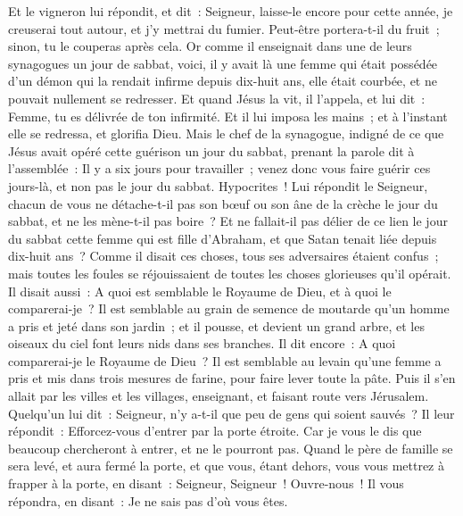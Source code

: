 \begin{multicols}{2}
Et le vigneron lui répondit, et dit~: Seigneur, laisse-le encore pour cette année, je creuserai tout autour, et j'y mettrai du fumier.
Peut-être portera-t-il du fruit~; sinon, tu le couperas après cela.
Or comme il enseignait dans une de leurs synagogues un jour de sabbat,
voici, il y avait là une femme qui était possédée d'un démon qui la rendait infirme depuis dix-huit ans, elle était courbée, et ne pouvait nullement se redresser.
Et quand Jésus la vit, il l'appela, et lui dit~: Femme, tu es délivrée de ton infirmité.
Et il lui imposa les mains~; et à l'instant elle se redressa, et glorifia Dieu.
Mais le chef de la synagogue, indigné de ce que Jésus avait opéré cette guérison un jour du sabbat, prenant la parole dit à l'assemblée~: Il y a six jours pour travailler~; venez donc vous faire guérir ces jours-là, et non pas le jour du sabbat.
Hypocrites~! Lui répondit le Seigneur, chacun de vous ne détache-t-il pas son bœuf ou son âne de la crèche le jour du sabbat, et ne les mène-t-il pas boire~?
Et ne fallait-il pas délier de ce lien le jour du sabbat cette femme qui est fille d'Abraham, et que Satan tenait liée depuis dix-huit ans~?
Comme il disait ces choses, tous ses adversaires étaient confus~; mais toutes les foules se réjouissaient de toutes les choses glorieuses qu'il opérait.
Il disait aussi~: A quoi est semblable le Royaume de Dieu, et à quoi le comparerai-je~?
Il est semblable au grain de semence de moutarde qu'un homme a pris et jeté dans son jardin~; et il pousse, et devient un grand arbre, et les oiseaux du ciel font leurs nids dans ses branches.
Il dit encore~: A quoi comparerai-je le Royaume de Dieu~?
Il est semblable au levain qu'une femme a pris et mis dans trois mesures de farine, pour faire lever toute la pâte.
Puis il s'en allait par les villes et les villages, enseignant, et faisant route vers Jérusalem.
Quelqu'un lui dit~: Seigneur, n'y a-t-il que peu de gens qui soient sauvés~? Il leur répondit~:
Efforcez-vous d'entrer par la porte étroite. Car je vous le dis que beaucoup chercheront à entrer, et ne le pourront pas.
Quand le père de famille se sera levé, et aura fermé la porte, et que vous, étant dehors, vous vous mettrez à frapper à la porte, en disant~: Seigneur, Seigneur~! Ouvre-nous~! Il vous répondra, en disant~: Je ne sais pas d'où vous êtes.

\end{multicols}
